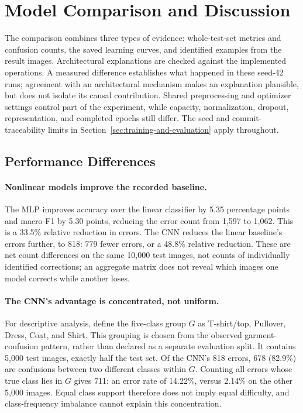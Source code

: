 \section{Model Comparison and Discussion}
\label{sec:comparison-and-discussion}

The comparison combines three types of evidence: whole-test-set metrics and confusion counts, the saved learning curves, and identified examples from the result images. Architectural explanations are checked against the implemented operations. A measured difference establishes what happened in these seed-42 runs; agreement with an architectural mechanism makes an explanation plausible, but does not isolate its causal contribution. Shared preprocessing and optimizer settings control part of the experiment, while capacity, normalization, dropout, representation, and completed epochs still differ. The seed and commit-traceability limits in Section~\ref{sec:training-and-evaluation} apply throughout.

\subsection{Performance Differences}

\paragraph{Nonlinear models improve the recorded baseline.}
The MLP improves accuracy over the linear classifier by 5.35 percentage points and macro-F1 by 5.30 points, reducing the error count from 1,597 to 1,062. This is a 33.5\% relative reduction in errors. The CNN reduces the linear baseline's errors further, to 818: 779 fewer errors, or a 48.8\% relative reduction. These are net count differences on the same 10,000 test images, not counts of individually identified corrections; an aggregate matrix does not reveal which images one model corrects while another loses.

\paragraph{The CNN's advantage is concentrated, not uniform.}
For descriptive analysis, define the five-class group $G$ as T-shirt/top, Pullover, Dress, Coat, and Shirt. This grouping is chosen from the observed garment-confusion pattern, rather than declared as a separate evaluation split. It contains 5,000 test images, exactly half the test set. Of the CNN's 818 errors, 678 (82.9\%) are confusions between two different classes within $G$. Counting all errors whose true class lies in $G$ gives 711: an error rate of 14.22\%, versus 2.14\% on the other 5,000 images. Equal class support therefore does not imply equal difficulty, and class-frequency imbalance cannot explain this concentration.

